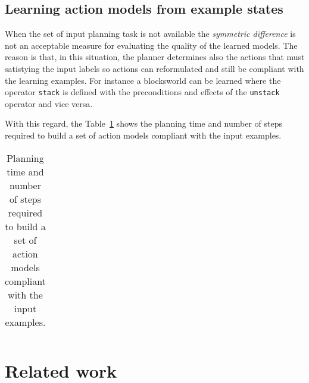\documentclass[letterpaper]{article} %
\begin{document}
\subsection{Learning action models from example states}
When the set of input planning task is not available the {\em symmetric difference} is not an acceptable measure for evaluating the quality of the learned models. The reason is that, in this situation, the planner determines also the actions that must satistying the input labels so actions can reformulated and still be compliant with the learning examples. For instance a blocksworld can be learned where the operator {\small\tt stack} is defined with the preconditions and effects of the {\small\tt unstack} operator and vice versa. 

With this regard, the Table~\ref{tab:noplans} shows the planning time and number of steps required to build a set of action models compliant with the input examples.


\begin{table}[hbt!]
\begin{footnotesize}
\begin{tabular}{cc}

\end{tabular}
\end{footnotesize}
\caption{\small Planning time and number of steps required to build a set of action models compliant with the input examples.}
  \label{tab:noplans}
\end{table}



\section{Related work}
\end{document}
